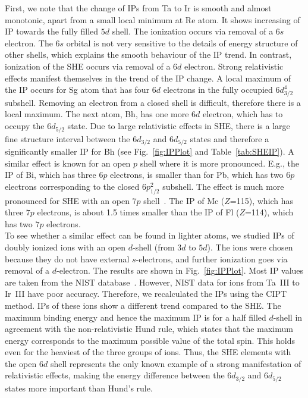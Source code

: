 \documentclass[10pt,a4paper, twoside, openright]{report}
\begin{document}
First, we note that the change of IPs from Ta to Ir is smooth and almost monotonic, apart from a small local minimum at Re atom. It shows increasing of IP towards the fully filled $5d$ shell. The ionization occurs via removal of a $6s$ electron. The $6s$ orbital is not very sensitive to the details of energy structure of other shells, which explains the smooth behaviour of the IP trend. In contrast, ionization of the SHE occurs via removal of a $6d$ electron. Strong relativistic effects manifest themselves in the trend of the IP change. A local maximum of the IP occurs for Sg atom that has four $6d$ electrons in the fully occupied $6d_{3/2}^4$ subshell. Removing an electron from a closed shell is difficult, therefore there is a local maximum. The next atom, Bh, has one more $6d$ electron, which has to occupy the $6d_{5/2}$ state. Due to large relativistic effects in SHE, there is a large fine structure interval between the  $6d_{3/2}$ and $6d_{5/2}$ states and therefore a significantly smaller IP for Bh (see Fig.~\ref{fig:IPPlot} and Table~\ref{tab:SHEIP}). A similar effect is known for an open $p$ shell where it is more pronounced. E.g., the IP of Bi, which has three $6p$ electrons, is smaller than for Pb, which has two $6p$ electrons corresponding to the closed $6p_{1/2}^2$ subshell. The effect is much more pronounced for SHE with an open $7p$ shell~\cite{DF2016}. The IP of Mc ($Z$=115), which has three $7p$ electrons, is about 1.5 times smaller than the IP of Fl ($Z$=114), which has two $7p$ electrons. \\
\linebreak
To see whether a similar effect can be found in lighter atoms, we studied IPs of doubly ionized ions with an open $d$-shell (from $3d$ to $5d$). The ions were chosen because they do not have external $s$-electrons, and further ionization goes via removal of a $d$-electron. The results are shown in Fig.~\ref{fig:IPPlot}. Most IP values are taken from the NIST database~\cite{NIST_ASD}. However, NIST data for ions from Ta~III to Ir~III have poor accuracy. Therefore, we recalculated the IPs using the CIPT method. IPs of these ions show a different trend compared to the SHE. The maximum binding energy and hence the maximum IP is for a half filled $d$-shell in agreement with the non-relativistic Hund rule, which states that the maximum energy corresponds to the maximum possible value of the total spin.  This holds even for the heaviest of the three groups of ions. Thus, the SHE elements with the open $6d$ shell represents the only known example of a strong manifestation of relativistic effects, making  the energy difference between the $6d_{3/2}$ and $6d_{5/2}$ states more important than Hund's rule. \\
\end{document}
